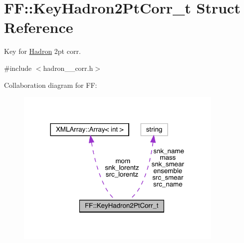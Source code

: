 \hypertarget{structFF_1_1KeyHadron2PtCorr__t}{}\section{FF\+:\+:Key\+Hadron2\+Pt\+Corr\+\_\+t Struct Reference}
\label{structFF_1_1KeyHadron2PtCorr__t}


Key for \mbox{\hyperlink{namespaceHadron}{Hadron}} 2pt corr.  




{\ttfamily \#include $<$hadron\+\_\+2pt\+\_\+corr.\+h$>$}



Collaboration diagram for FF\+:\nopagebreak
\begin{figure}[H]
\begin{center}
\leavevmode
\includegraphics[width=281pt]{d7/df9/structFF_1_1KeyHadron2PtCorr__t__coll__graph}
\end{center}
\end{figure}
